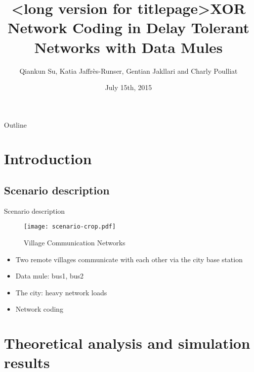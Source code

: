 \documentclass[compress]{beamer}
\title[<short version for footer>]{<long version for titlepage>}
\title{XOR Network Coding in Delay Tolerant Networks with Data Mules \\
}
\author{Qiankun Su, Katia Jaffrès-Runser, Gentian Jakllari and Charly Poulliat}
\date{July 15th, 2015}
\begin{document}
\begin{frame}
	\titlepage
\end{frame}

\begin{frame}{Outline}
	\tableofcontents
\end{frame}


\section{Introduction}

\subsection{Scenario description}

\begin{frame}{Scenario description} 
	\begin{figure}[!t]
		\centering
		\texttt{[image: scenario-crop.pdf]}
		\caption{Village Communication Networks}
		\label{f_scenario}
	\end{figure}
	
	
	\begin{itemize}
		\item Two remote villages communicate with each other via the city base station
		\item Data mule: bus1, bus2
		      \pause
		\item The city: heavy network loads
		\item Network coding            
	\end{itemize}        
\end{frame}



\section{Theoretical analysis and simulation results}
\end{document}
